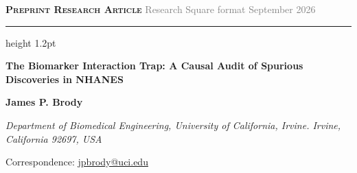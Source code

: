 \documentclass[10pt,letterpaper]{article}
\begin{document}
\thispagestyle{empty}
\noindent
\begin{minipage}{\linewidth}
    \textsf{\textbf{\textcolor{preprintaccent}{\textsc{Preprint \textbullet{} Research Article}}}} \hfill \textsf{\footnotesize\textcolor{gray}{Research Square format \textbullet{} September 2026}}
    \vspace{3pt}\hrule height 1.2pt \vspace{14pt}
\end{minipage}

\begin{flushleft}
    {\LARGE\sffamily\bfseries\color{preprintdark} The Biomarker Interaction Trap: A Causal Audit of Spurious Discoveries in NHANES\par}
    \vspace{12pt}
    {\large\textbf{James P. Brody}\par}
    \vspace{3pt}
    {\small\textit{Department of Biomedical Engineering, University of California, Irvine. Irvine, California 92697, USA}\par}
    \vspace{2pt}
    {\small\textsf{Correspondence: \href{mailto:jpbrody@uci.edu}{jpbrody@uci.edu}}\par}
\end{flushleft}

\vspace{10pt}
\end{document}
